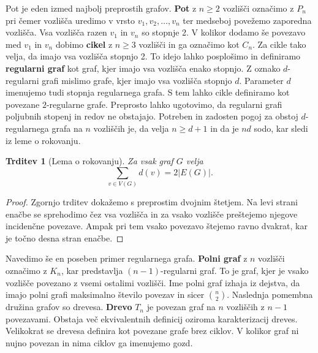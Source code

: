 \documentclass[12pt,a4paper,twoside]{article}
\theoremstyle{definition} %
\theoremstyle{plain} %
\newtheorem{trditev}[definicija]{Trditev}
\numberwithin{equation}{section}  %
\begin{document}
Pot je eden izmed najbolj preprostih grafov. \textbf{Pot} z $n \ge 2$ vozlišči označimo z $P_n$ pri čemer vozlišča uredimo v vrsto $v_1, v_2, \ldots, v_n$ ter medseboj povežemo zaporedna vozlišča. Vsa vozlišča razen $v_1$ in $v_n$ so stopnje 2. V kolikor dodamo še povezavo med $v_1$ in $v_n$ dobimo \textbf{cikel} z $n \ge 3$ vozlišči in ga označimo kot $C_n$. Za cikle tako velja, da imajo vsa vozlišča stopnjo 2. To idejo lahko posplošimo in definiramo \textbf{regularni graf} kot graf, kjer imajo vsa vozlišča enako stopnjo. Z oznako $d$-regularni grafi mislimo grafe, kjer imajo vsa vozlišča stopnjo $d$. Parameter $d$ imenujemo tudi stopnja regularnega grafa. S tem lahko cikle definiramo kot povezane $2$-regularne grafe. Preprosto lahko ugotovimo, da regularni grafi poljubnih stopenj in redov ne obstajajo. Potreben in zadosten pogoj za obstoj $d$-regularnega grafa na $n$ vozliščih je, da velja $n \ge d + 1$ in da je $nd$ sodo, kar sledi iz leme o rokovanju.
\begin{trditev}[Lema o rokovanju]
Za vsak graf $G$ velja
$$ \sum_{v \in V(G)} d(v) = 2 |E(G)|. $$
\end{trditev}
\begin{proof}
Zgornjo trditev dokažemo s preprostim dvojnim štetjem. Na levi strani enačbe se sprehodimo čez vsa vozlišča in za vsako vozlišče preštejemo njegove incidenčne povezave.
Ampak pri tem vsako povezavo štejemo ravno dvakrat, kar je točno desna stran enačbe.
\end{proof}
 Navedimo še en poseben primer regularnega grafa. \textbf{Polni graf} z $n$ vozlišči označimo z $K_n$, kar predstavlja $(n-1)$-regularni graf. To je graf, kjer je vsako vozlišče povezano z vsemi ostalimi vozlišči. Ime polni graf izhaja iz dejstva, da imajo polni grafi maksimalno število povezav in sicer ${n \choose 2}$. Naslednja pomembna družina grafov so drevesa. \textbf{Drevo} $T_n$ je povezan graf na $n$ vozliščih z $n-1$ povezavami. Obstaja več ekvivalentnih definicij oziroma karakterizacij dreves. Velikokrat se drevesa definira kot povezane grafe brez ciklov. V kolikor graf ni nujno povezan in nima ciklov ga imenujemo gozd.
\end{document}
